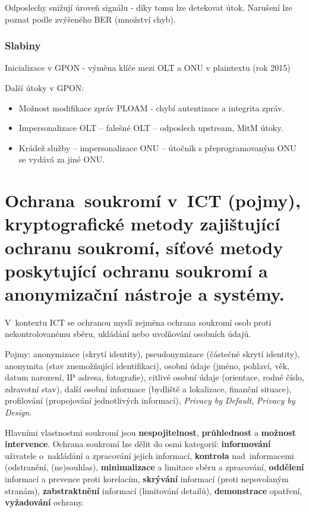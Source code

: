 Odposlechy snižují úroveň signálu - díky tomu lze detekovat útok.
Narušení lze poznat podle zvýšeného BER (množství chyb).

\subsubsection{Slabiny}
Inicializace v GPON - výměna klíče mezi OLT a ONU v plaintextu (rok 2015)

Další útoky v GPON:
\begin{itemize}
    \item Možnost modifikace zpráv PLOAM - chybí autentizace a integrita zpráv.
    \item Impersonalizace OLT – falešné OLT – odposlech upstream, MitM útoky.
    \item Krádež služby – impersonalizace ONU – útočník s přeprogramovaným ONU se vydává za jiné ONU. 
\end{itemize}

\clearpage
\section{Ochrana~soukromí v~ICT (pojmy), kryptografické metody zajištující ochranu soukromí, síťové metody poskytující ochranu soukromí a anonymizační nástroje a systémy.}

V~kontextu ICT se ochranou myslí zejména ochrana soukromí osob proti nekontrolovanému sběru, ukládání nebo uvolňování osobních údajů.

Pojmy: anonymizace (skrytí identity), pseudonymizace (částečné skrytí identity), anonymita (stav znemožňující identifikaci), osobní údaje (jméno, pohlaví, věk, datum narození, IP adresa, fotografie), citlivé osobní údaje (orientace, rodné číslo, zdravotní stav), další osobní informace (bydliště a lokalizace, finanční situace), profilování (propojování jednotlivých informací), \emph{Privacy by Default}, \emph{Privacy by Design}.

Hlavními vlastnostmi soukromí jsou \textbf{nespojitelnost}, \textbf{průhlednost} a \textbf{možnost intervence}.
Ochrana soukromí lze dělit do osmi kategorií:
\textbf{informování} uživatele o~nakládání a zpracování jejich informací, \textbf{kontrola} nad~informacemi (odstranění, (ne)souhlas), \textbf{minimalizace} a limitace sběru a zpracování, \textbf{oddělení} informací a prevence proti korelacím, \textbf{skrývání} informací (proti nepovolaným stranám), \textbf{zabstraktnění} informací (limitování detailů), \textbf{demonstrace} opatření, \textbf{vyžadování} ochrany.

